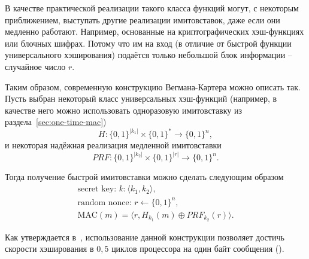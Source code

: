 В качестве практической реализации такого класса функций могут, с некоторым приближением, выступать другие реализации имитовставок, даже если они медленно работают. Например, основанные на криптографических хэш-функциях или блочных шифрах. Потому что им на вход (в отличие от быстрой функции универсального хэширования) подаётся только небольшой блок информации -- случайное число $r$.

Таким образом, современную конструкцию Вегмана-Картера можно описать так. Пусть выбран некоторый класс универсальных хэш-функций (например, в качестве него можно использовать одноразовую имитовставку из раздела~\ref{sec:one-time-mac}) \[
    H: \{0,1\}^{|k_1|} \times \{0,1\}^* \to \{0,1\}^n,
\] и некоторая надёжная реализация медленной имитовставки \[
    PRF: \{0,1\}^{|k_2|} \times \{0,1\}^{|r|} \to \{0,1\}^n.
\]

Тогда получение быстрой имитовставки можно сделать следующим образом
\[ \begin{array}{l}
\textrm{secret key: } k: \langle k_1, k_2 \rangle,\\
\textrm{random nonce: } r \leftarrow \{0,1\}^n,\\
\textrm{MAC} (m) = \langle r, H_{k_1}(m) \oplus PRF_{k_2}(r) \rangle.
\end{array} \]

Как утверждается в~\cite{Krovetz:2000}, использование данной конструкции позволяет достичь скорости хэширования в $0{,}5$ циклов процессора на один байт сообщения ().
